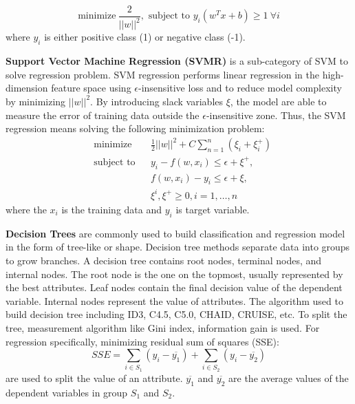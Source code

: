 \documentclass[12pt,english]{report}
\begin{document}
\begin{equation}
\text{minimize} \ \frac{2}{||w||^2},
\text{ subject to }
y_{i}(w^T x +b) \geq 1 \ \forall i
\end{equation}
where $y_i$ is either positive class (1) or negative class (-1).

\vspace{0.15in}
\noindent \textbf{Support Vector Machine Regression (SVMR)} is a sub-category of SVM to solve regression problem.  SVM regression performs linear regression in the high-dimension feature space using  $\epsilon$-insensitive loss and to reduce model complexity by minimizing $||w||^2$. By introducing slack variables $\xi$, the model are able to measure the error of training data outside the $\epsilon$-insensitive zone.
Thus, the SVM regression means solving the following minimization problem: 
\begin{equation}
    \begin{aligned}
     &   \text{minimize}
     & & \frac{1}{2} {||w||^2} + C \sum_{n=1}^{n}(\xi_i + \xi_i^+) \\
     & \text{subject to} 
     & & y_{i} - f(w,x_i) \leq  \epsilon + \xi^+, \\
     &&& f(w,x_i) - y_{i} \leq \epsilon + \xi, \\
     &&& \xi^i, \xi^+ \geq 0, i=1,\dots,n
    \end{aligned}
\end{equation}
where the $x_i$ is the training data and $y_i$ is target variable.

\vspace{0.15in}
\noindent \textbf{Decision Trees} are commonly used to build classification and regression model in the form of tree-like or shape. Decision tree methods separate data into groups to grow branches. A decision tree contains root nodes, terminal nodes, and internal nodes. The root node is the one on the topmost, usually represented by the best attributes. Leaf nodes contain the final decision value of the dependent variable. Internal nodes represent the value of attributes. The algorithm used to build decision tree including ID3, C4.5, C5.0, CHAID, CRUISE, etc. To split the tree, measurement algorithm like Gini index, information gain is used. For regression specifically, minimizing  residual sum of squares (SSE):
\begin{equation}
    SSE = \sum_{i \in S_1} (y_i - \overline{y_1}) + \sum_{i \in S_2} (y_i - \overline{y_2})
\end{equation}
are used to split the value of an attribute. $\overline{y_1}$ and $\overline{y_2}$ are the average values of the dependent variables in group $S_1$ and $S_2$. 
\end{document}
